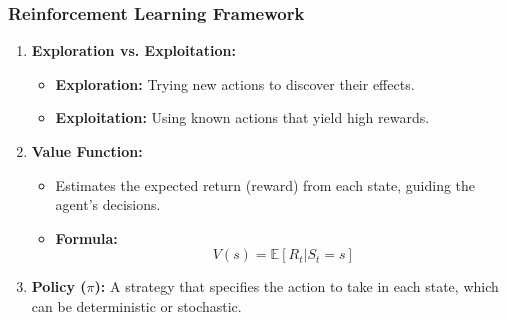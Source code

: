 \documentclass[aspectratio=169]{beamer}
\begin{document}
\begin{frame}[fragile]
    \frametitle{Reinforcement Learning Framework}
    \begin{enumerate}
        \item \textbf{Exploration vs. Exploitation:} 
        \begin{itemize}
            \item \textbf{Exploration:} Trying new actions to discover their effects.
            \item \textbf{Exploitation:} Using known actions that yield high rewards.
        \end{itemize}
        
        \item \textbf{Value Function:} 
        \begin{itemize}
            \item Estimates the expected return (reward) from each state, guiding the agent’s decisions.
            \item \textbf{Formula:} 
            \begin{equation}
                V(s) = \mathbb{E}[R_t | S_t = s]
            \end{equation}
        \end{itemize}
        
        \item \textbf{Policy ($\pi$):} A strategy that specifies the action to take in each state, which can be deterministic or stochastic.
    \end{enumerate}
\end{frame}
\end{document}
